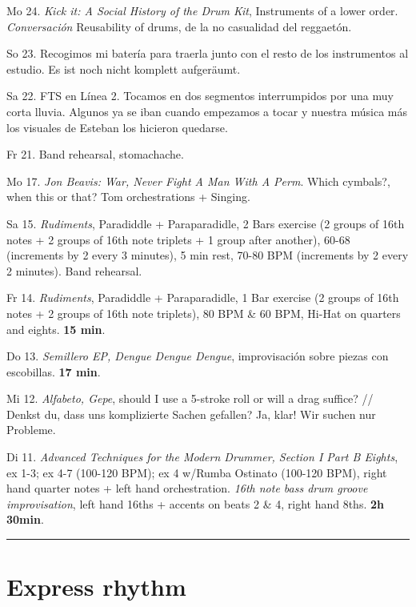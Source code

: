 \documentclass[
]{book}
\begin{document}
Mo 24. \emph{Kick it: A Social History of the Drum Kit}, Instruments of a lower order. \emph{Conversación} Reusability of drums, de la no casualidad del reggaetón.

So 23. Recogimos mi batería para traerla junto con el resto de los instrumentos al estudio. Es ist noch nicht komplett aufgeräumt.

Sa 22. FTS en Línea 2. Tocamos en dos segmentos interrumpidos por una muy corta lluvia. Algunos ya se iban cuando empezamos a tocar y nuestra música más los visuales de Esteban los hicieron quedarse.

Fr 21. Band rehearsal, stomachache.

Mo 17. \emph{Jon Beavis: War, Never Fight A Man With A Perm}. Which cymbals?, when this or that? Tom orchestrations + Singing.

Sa 15. \emph{Rudiments}, Paradiddle + Paraparadidle, 2 Bars exercise (2 groups of 16th notes + 2 groups of 16th note triplets + 1 group after another), 60-68 (increments by 2 every 3 minutes), 5 min rest, 70-80 BPM (increments by 2 every 2 minutes). Band rehearsal.

\label{okt152022}

Fr 14. \emph{Rudiments}, Paradiddle + Paraparadidle, 1 Bar exercise (2 groups of 16th notes + 2 groups of 16th note triplets), 80 BPM \& 60 BPM, Hi-Hat on quarters and eights. \textbf{15 min}.

Do 13. \emph{Semillero EP, Dengue Dengue Dengue}, improvisación sobre piezas con escobillas. \textbf{17 min}.

Mi 12. \emph{Alfabeto, Gepe}, should I use a 5-stroke roll or will a drag suffice? // Denkst du, dass uns komplizierte Sachen gefallen? Ja, klar! Wir suchen nur Probleme.

Di 11. \emph{Advanced Techniques for the Modern Drummer, Section I Part B Eights}, ex 1-3; ex 4-7 (100-120 BPM); ex 4 w/Rumba Ostinato (100-120 BPM), right hand quarter notes + left hand orchestration. \emph{16th note bass drum groove improvisation}, left hand 16ths + accents on beats 2 \& 4, right hand 8ths. \textbf{2h 30min}.

\label{okt112022}

\begin{center}\rule{0.5\linewidth}{0.5pt}\end{center}

\chapter{Express rhythm}\label{Express-rhythm}
\end{document}
